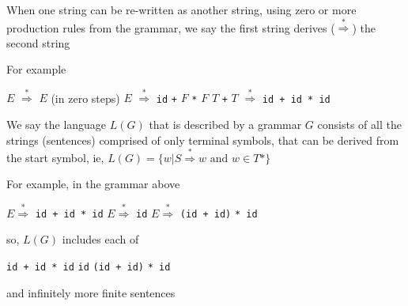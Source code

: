 \documentclass[8pt,a4paper,compress]{beamer}
\newcommand{\mm}[1]{$#1$}
\newcommand{\derives}{\stackrel{*}{\Rightarrow}}
\newenvironment{spaced}
{
\smallskip
\hspace{.5cm}
\begin{minipage}[c]{\textwidth}
}
{
\end{minipage}
\smallskip
}
\begin{document}
\begin{frame}[fragile]
\pause

When one string can be re-written as another string, using zero or more production rules from the grammar, we say the first string derives ($\derives$) the second string

\pause
\bigskip
 
For example

\text{ }
\begin{spaced}
\begin{production}
\mm{E} \mm{\derives} \mm{E} (in zero steps)
\mm{E} \mm{\derives} \lstinline{id} \lstinline{+} \mm{F} \lstinline{*} \mm{F}
\mm{T} \lstinline{+} \mm{T} \mm{\derives}  \lstinline{id + id * id}
\end{production}
\end{spaced}

\pause
\bigskip

We say the language $L(G)$ that is described by a grammar $G$ consists of all the strings (sentences) comprised of only terminal symbols, that can be derived from the start symbol, ie, $L(G) = \{w | S \derives w \text{ and } w \in T*\}$

\pause
\bigskip

For example, in the grammar above

\text{ }
\begin{spaced}
\begin{production}
\mm{E \derives} \lstinline{id + id * id}
\mm{E \derives} \lstinline{id}
\mm{E \derives} \lstinline{(id + id)} \lstinline{* id}
\end{production}
\end{spaced}

\noindent so,  $L(G)$ includes each of

\text{ }
\begin{spaced}
\begin{production}
\lstinline{id + id * id}
\lstinline{id}
\lstinline{(id + id)} \lstinline{* id}
\end{production}
\end{spaced}

\noindent and infinitely more finite sentences
\end{frame}
\end{document}
